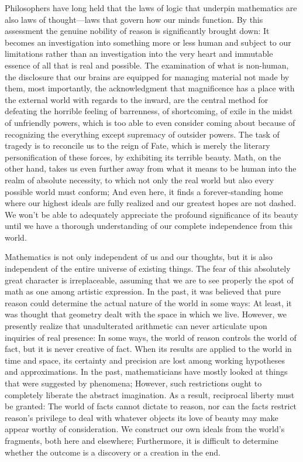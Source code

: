 \documentclass[a4paper,12pt]{book}[2004/02/16]
\theoremstyle{ilemma}
\theoremstyle{itheorem}
\theoremstyle{iother}
\theoremstyle{icorollary}
\theoremstyle{numcorollary}
\theoremstyle{idefinition}
\begin{document}
Philosophers have long held that the laws of logic that underpin mathematics are also laws of thought—laws that govern how our minds function. By this assessment the genuine nobility of reason is significantly
brought down: It becomes an investigation into something more or less human and subject to our limitations rather than an investigation into the very heart and immutable essence of all that is real and possible. The examination of what is non-human, the disclosure
that our brains are equipped for managing material not made by
them, most importantly, the acknowledgment that magnificence has a place with the external
world with regards to the inward, are the central method for defeating the horrible
feeling of barrenness, of shortcoming, of exile in the midst of unfriendly powers, which
is too able to even consider coming about because of recognizing the everything except supremacy of
outsider powers. The task of tragedy is to reconcile us to the reign of Fate, which is merely the literary personification of these forces, by exhibiting its terrible beauty. Math, on the other hand, takes us even further away from what it means to be human into the realm of absolute necessity, to which not only the real world but also every possible world must conform; And even here, it finds a forever-standing home where our highest ideals are fully realized and our greatest hopes are not dashed. We won't be able to adequately appreciate the profound significance of its beauty until we have a thorough understanding of our complete independence from this world.

Mathematics is not only independent of us and our thoughts, but it is also independent of the entire universe of existing things. The fear of this absolutely great
character is irreplaceable, assuming that we are to see properly the spot
of math as one among artistic expression. In the past, it was believed that pure reason could determine the actual nature of the world in some ways: At least, it was thought that geometry dealt with the space in which we live. However, we presently realize that unadulterated arithmetic can never
articulate upon inquiries of real presence: In some ways, the world of reason controls the world of fact, but it is never creative of fact. When its results are applied to the world in time and space, its certainty and precision are lost among working hypotheses and approximations. In the past, mathematicians have mostly looked at things that were suggested by phenomena; However, such restrictions ought to completely liberate the abstract imagination. As a result, reciprocal liberty must be granted: The world of facts cannot dictate to reason, nor can the facts restrict reason's privilege to deal with whatever objects its love of beauty may make appear worthy of consideration. We construct our own ideals from the world's fragments, both here and elsewhere;
Furthermore, it is difficult to determine whether the outcome is a discovery or a creation in the end.
\end{document}
